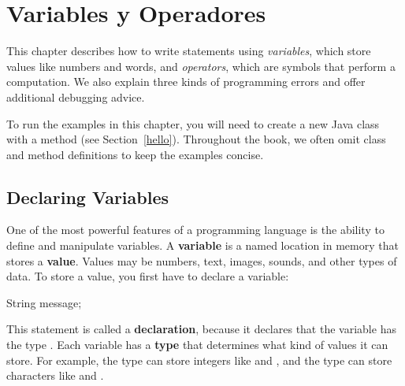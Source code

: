 \chapter{Variables y Operadores}
\label{variables}

This chapter describes how to write statements using {\em variables}, which store values like numbers and words, and {\em operators}, which are symbols that perform a computation.
We also explain three kinds of programming errors and offer additional debugging advice.

To run the examples in this chapter, you will need to create a new Java class with a  method (see Section~\ref{hello}).
Throughout the book, we often omit class and method definitions to keep the examples concise.


\section{Declaring Variables}



One of the most powerful features of a programming language is the ability to define and manipulate variables.
A {\bf variable} is a named location in memory that stores a {\bf value}.
Values may be numbers, text, images, sounds, and other types of data.
To store a value, you first have to declare a variable:

\begin{code}
String message;
\end{code}


This statement is called a {\bf declaration}, because it declares that the variable  has the type .
Each variable has a {\bf type} that determines what kind of values it can store.
For example, the  type can store integers like  and , and the  type can store characters like  and .

